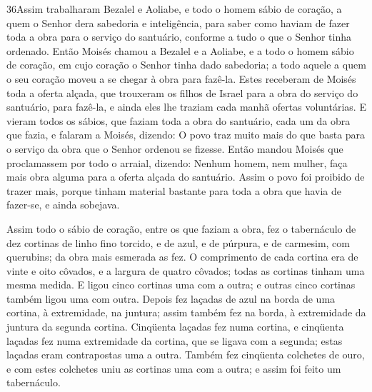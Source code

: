 \lettrine{36} Assim trabalharam Bezalel e Aoliabe, e todo o
homem sábio de coração, a quem o Senhor dera sabedoria e
inteligência, para saber como haviam de fazer toda a obra para o
serviço do santuário, conforme a tudo o que o Senhor tinha ordenado.
Então Moisés chamou a Bezalel e a Aoliabe, e a todo o homem
sábio de coração, em cujo coração o Senhor tinha dado sabedoria; a
todo aquele a quem o seu coração moveu a se chegar à obra para
fazê-la. Estes receberam de Moisés toda a oferta alçada, que
trouxeram os filhos de Israel para a obra do serviço do santuário,
para fazê-la, e ainda eles lhe traziam cada manhã ofertas
voluntárias. E vieram todos os sábios, que faziam toda a obra do
santuário, cada um da obra que fazia, e falaram a Moisés,
dizendo: O povo traz muito mais do que basta para o serviço da obra
que o Senhor ordenou se fizesse. Então mandou Moisés que
proclamassem por todo o arraial, dizendo: Nenhum homem, nem mulher,
faça mais obra alguma para a oferta alçada do santuário. Assim o
povo foi proibido de trazer mais, porque tinham material
bastante para toda a obra que havia de fazer-se, e ainda sobejava.

Assim todo o sábio de coração, entre os que faziam a obra, fez o
tabernáculo de dez cortinas de linho fino torcido, e de azul, e de
púrpura, e de carmesim, com querubins; da obra mais esmerada as fez.
O comprimento de cada cortina era de vinte e oito côvados, e a
largura de quatro côvados; todas as cortinas tinham uma mesma
medida. E ligou cinco cortinas uma com a outra; e outras
cinco cortinas também ligou uma com outra. Depois fez laçadas
de azul na borda de uma cortina, à extremidade, na juntura; assim
também fez na borda, à extremidade da juntura da segunda cortina.
Cinqüenta laçadas fez numa cortina, e cinqüenta laçadas fez
numa extremidade da cortina, que se ligava com a segunda; estas
laçadas eram contrapostas uma a outra. Também fez cinqüenta
colchetes de ouro, e com estes colchetes uniu as cortinas uma com a
outra; e assim foi feito um tabernáculo.

